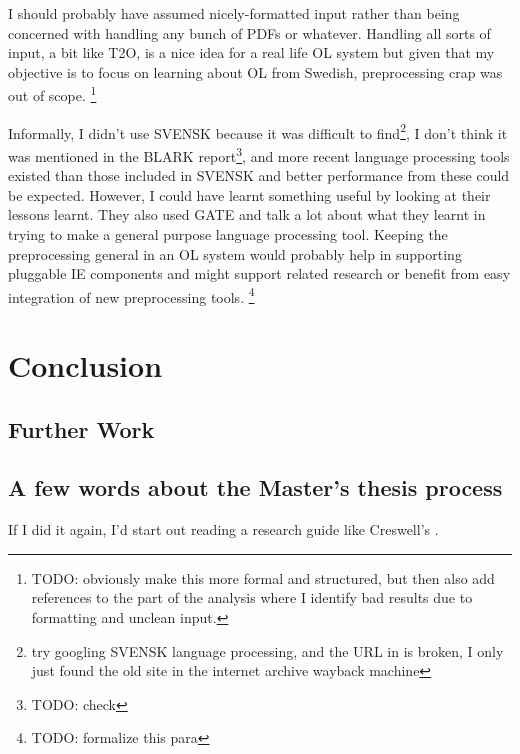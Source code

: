 \documentclass[a4paper]{report}
\newcommand{\todo}[1]{\footnote{{\color{red} TODO: #1}}}
\begin{document}
I should probably have assumed nicely-formatted input rather than being concerned with handling any bunch of PDFs or whatever.
Handling all sorts of input, a bit like T2O, is a nice idea for a real life OL system but given that my objective is to focus on learning about OL from Swedish, preprocessing crap was out of scope. 
\todo{obviously make this more formal and structured, but then also add references to the part of the analysis where I identify bad results due to formatting and unclean input.}

Informally, I didn't use SVENSK because it was difficult to find\footnote{try googling SVENSK language processing, and the URL in \cite{Olsson98SVENSKTagging} is broken, I only just found the old site in the internet archive wayback machine}, I don't think it was mentioned in the BLARK report\todo{check}, and more recent language processing tools existed than those included in SVENSK and better performance from these could be expected.
However, I could have learnt something useful by looking at their lessons learnt.
They also used GATE and talk a lot about what they learnt in trying to make a general purpose language processing tool.
Keeping the preprocessing general in an OL system would probably help in supporting pluggable IE components and might support related research or benefit from easy integration of new preprocessing tools. \todo{formalize this para}


\chapter{Conclusion}

\section{Further Work}

\section{A few words about the Master's thesis process}

If I did it again, I'd start out reading a research guide like Creswell's \cite{creswell2003research}.
\end{document}
